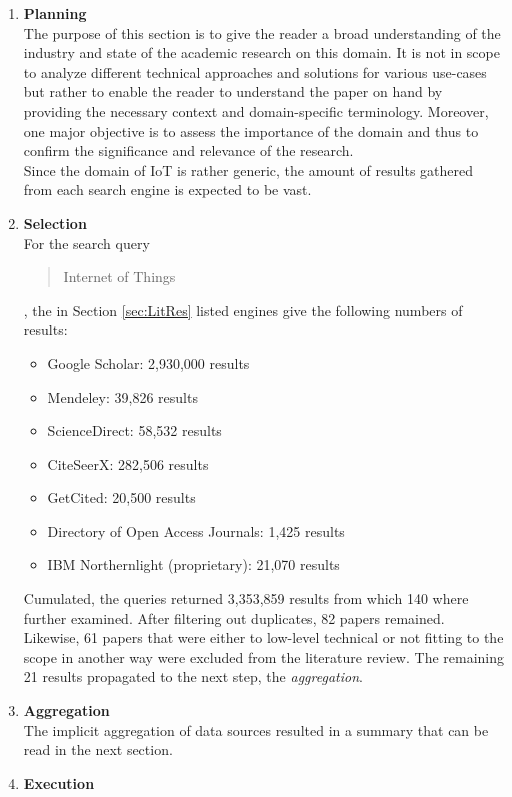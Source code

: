\begin{enumerate}
    \item
    \textbf{Planning}\\
    The purpose of this section is to give the reader a broad understanding of the industry and state of the academic research on this domain. It is not in scope to analyze different technical approaches and solutions for various use-cases but rather to enable the reader to understand the paper on hand by providing the necessary context and domain-specific terminology. Moreover, one major objective is to assess the importance of the domain and thus to confirm the significance and relevance of the research.\\
    Since the domain of \acf{IoT} is rather generic, the amount of results gathered from each search engine is expected to be vast.
    
    \item
    \textbf{Selection}\\
    For the search query \blockquote{Internet of Things}, the in Section \ref{sec:LitRes} listed engines give the following numbers of results:
    
    \begin{itemize}
        \renewcommand\labelitemi{--}
        \item Google Scholar: 2,930,000 results
        \item Mendeley: 39,826 results
        \item ScienceDirect: 58,532 results
        \item CiteSeerX: 282,506 results
        \item GetCited: 20,500 results
        \item Directory of Open Access Journals: 1,425 results
        \item IBM Northernlight (proprietary): 21,070 results
    \end{itemize}
    
    Cumulated, the queries returned 3,353,859 results from which 140 where further examined. After filtering out duplicates, 82 papers remained. Likewise, 61 papers that were either to low-level technical or not fitting to the scope in another way were excluded from the literature review. The remaining 21 results propagated to the next step, the \textit{aggregation}.
    
    \item
    \textbf{Aggregation}\\
    The implicit aggregation of data sources resulted in a summary that can be read in the next section.
        
    
    
    \item
        \textbf{Execution}\\
    
    
\end{enumerate}


